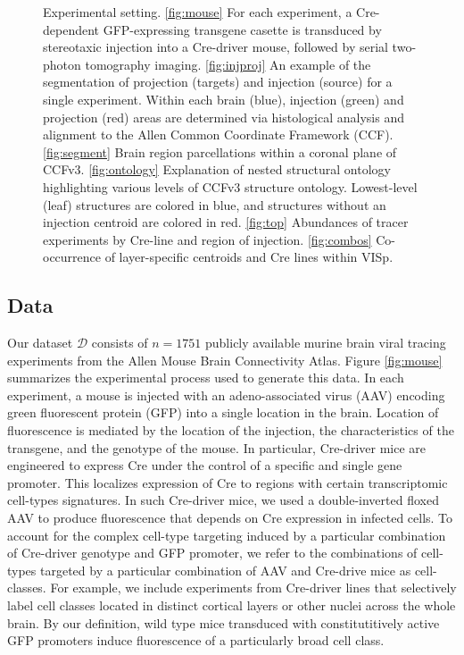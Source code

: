 \begin{figure}[H]
    \caption{Experimental setting.  \ref{fig:mouse}  For each experiment, a Cre-dependent GFP-expressing transgene casette is transduced by stereotaxic injection into a Cre-driver mouse, followed by serial two-photon tomography imaging.
    \ref{fig:injproj} An example of the segmentation of projection (targets) and injection (source) for a single experiment. Within each brain (blue), injection (green) and projection (red) areas are determined via histological analysis and alignment to the Allen Common Coordinate Framework (CCF).
    \ref{fig:segment} Brain region parcellations within a coronal plane of CCFv3. \ref{fig:ontology} Explanation of nested structural ontology highlighting various levels of CCFv3 structure ontology. Lowest-level (leaf) structures are colored in blue, and structures without an injection centroid are colored in red.
    \ref{fig:top}  Abundances of tracer experiments by Cre-line and region of injection. \ref{fig:combos}  Co-occurrence of layer-specific centroids and Cre lines within VISp.}
    \label{fig:data}
\end{figure}

\newpage

\subsection{Data}


Our dataset $\mathcal D$ consists of $n=1751$ publicly available murine brain viral tracing experiments from the Allen Mouse Brain Connectivity Atlas.
Figure \ref{fig:mouse} summarizes the experimental process used to generate this data.
In each experiment, a mouse is injected with an adeno-associated virus (AAV) encoding green fluorescent protein (GFP) into a single location in the brain.
Location of fluorescence is mediated by the location of the injection, the characteristics of the transgene, and the genotype of the mouse.
In particular, Cre-driver mice are engineered to express Cre under the control of a specific and single gene promoter.
This localizes expression of Cre to regions with certain transcriptomic cell-types signatures.
In such Cre-driver mice, we used a double-inverted floxed AAV to produce fluorescence that depends on Cre expression in infected cells.
To account for the complex cell-type targeting induced by a particular combination of Cre-driver genotype and GFP promoter, we refer to the combinations of cell-types targeted by a particular combination of AAV and Cre-drive mice as cell-classes.
For example, we include experiments from Cre-driver lines that selectively label cell classes located in distinct cortical layers or other nuclei across the whole brain.
By our definition, wild type mice transduced with constitutitively active GFP promoters induce fluorescence of a particularly broad cell class.

